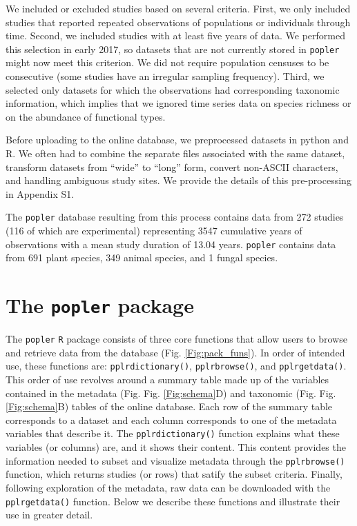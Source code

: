 \documentclass{article}\usepackage[]{graphicx}\usepackage[]{color}
\begin{document}
We included or excluded studies based on several criteria. First, we only included studies that reported repeated observations of populations or individuals through time. Second, we included studies with at least five years of data. We performed this selection in early 2017, so datasets that are not currently stored in \texttt{popler} might now meet this criterion. We did not require population censuses to be consecutive (some studies have an irregular sampling frequency). Third, we selected only datasets for which the observations had corresponding taxonomic information, which implies that we ignored time series data on species richness or on the abundance of functional types.

Before uploading to the online database, we preprocessed datasets in python and R. We often had to combine the separate files associated with the same dataset, transform datasets from ``wide'' to ``long'' form, convert non-ASCII characters, and handling ambiguous study sites. We provide the details of this pre-processing in Appendix S1.


The \texttt{popler} database resulting from this process contains data from 272 studies (116 of which are experimental) representing 3547 cumulative years of observations with a mean study duration of 13.04 years. \texttt{popler} contains data from 691 plant species, 349 animal species, and 1 fungal species.

\section*{The \texttt{popler} package}
The \texttt{popler} \texttt{R} package consists of three core functions that allow users to browse and retrieve data from the database (Fig. \ref{Fig:pack_funs}). In order of intended use, these functions are: \texttt{pplr\textunderscore dictionary()}, \texttt{pplr\textunderscore browse()}, and \texttt{pplr\textunderscore get\textunderscore data()}. This order of use revolves around a summary table made up of the variables contained in the metadata (Fig. Fig. \ref{Fig:schema}D) and taxonomic (Fig. Fig. \ref{Fig:schema}B) tables of the online database. Each row of the summary table corresponds to a dataset and each column corresponds to one of the metadata variables that describe it. The \texttt{pplr\textunderscore dictionary()} function explains what these variables (or columns) are, and it shows their content. This content provides the information needed to subset and visualize metadata through the \texttt{pplr\textunderscore browse()} function, which returns studies (or rows) that satify the subset criteria. Finally, following exploration of the metadata, raw data can be downloaded with the \texttt{pplr\textunderscore get\textunderscore data()} function. Below we describe these functions and illustrate their use in greater detail.
\end{document}
